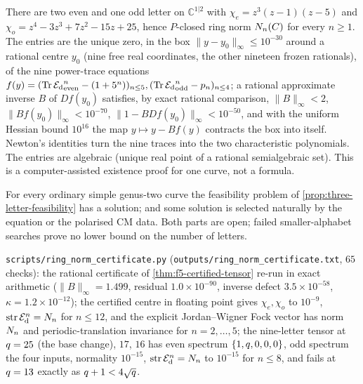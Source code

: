 \begin{theorem}
\label{thm:f5-certified-tensor}
There are two even and one odd letter on $\mathbb C^{1|2}$ with
$\chi_e = z^3(z-1)(z-5)$ and $\chi_o = z^4-3z^3+7z^2-15z+25$, hence $P$-closed ring norm
$N_{n}(C)$ for every $n\ge1$. The entries are the unique zero, in the box
$\|y-y_0\|_\infty\le10^{-30}$ around a rational centre $y_0$ (nine free real coordinates, the
other nineteen frozen rationals), of the nine power-trace equations
$f(y) = (\operatorname{Tr}{\mathcal E_{\mathrm d}}_{\mathrm{even}}^n-(1+5^n))_{n\le5},(\operatorname{Tr}{\mathcal E_{\mathrm d}}_{\mathrm{odd}}^n-p_n)_{n\le4}$; a
rational approximate inverse $B$ of $Df(y_0)$ satisfies, by exact rational comparison,
$\|B\|_\infty<2$, $\|Bf(y_0)\|_\infty<10^{-70}$, $\|1-BDf(y_0)\|_\infty<10^{-50}$, and with the
uniform Hessian bound $10^{16}$ the map $y\mapsto y-Bf(y)$ contracts the box into itself.
Newton's identities turn the nine traces into the two characteristic polynomials. The entries
are algebraic (unique real point of a rational semialgebraic set). This is a computer-assisted
existence proof for one curve, not a formula.
\end{theorem}

\begin{conjecture}
\label{conj:three-letter-universal}
For every ordinary simple genus-two curve the feasibility problem of
\cref{prop:three-letter-feasibility} has a solution; and some solution is selected naturally
by the equation or the polarised CM data. Both parts are open; failed smaller-alphabet
searches prove no lower bound on the number of letters.
\end{conjecture}

\begin{numerical}
\label{num:ring-norm-certificate}
\texttt{scripts/ring\_norm\_certificate.py} (\texttt{outputs/ring\_norm\_certificate.txt}, $65$ checks):
the rational certificate of \cref{thm:f5-certified-tensor} re-run in exact arithmetic
($\|B\|_\infty = 1.499$, residual $1.0\times10^{-90}$, inverse defect $3.5\times10^{-58}$,
$\kappa = 1.2\times10^{-12}$); the certified centre in floating point gives $\chi_e,\chi_o$ to
$10^{-9}$, $\operatorname{str}\mathcal E_{\mathrm d}^n = N_{n}$ for $n\le12$, and the explicit Jordan--Wigner Fock vector has
norm $N_{n}$ and periodic-translation invariance for $n = 2,\dots,5$; the nine-letter tensor
at $q = 25$ (the base change), $17$, $16$ has even spectrum $\{1,q,0,0,0\}$, odd spectrum the
four inputs, normality $10^{-15}$, $\operatorname{str}\mathcal E_{\mathrm d}^n = N_{n}$ to $10^{-15}$ for $n\le8$, and fails at
$q = 13$ exactly as $q+1<4\sqrt{q}$.
\end{numerical}

